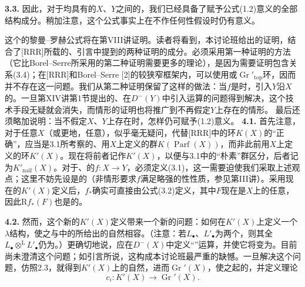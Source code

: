 \textbf{3.3.} 因此，对于均具有的$X$、$Y$之间的，我们已经具备了赋予公式(1.2)意义的全部结构成分。稍加注意，这个公式事实上在不作任何性假设时仍有意义。

这个的黎曼--罗赫公式将在第VIII讲证明。读者将看到，本讨论班给出的证明，结合了[RRR]所载的、引言中提到的两种证明的成分。必须采用第一种证明的方法（它比Borel--Serre所采用的第二种证明需要更多的理论），是因为需要证明包含关系(3.4)；在[RRR]和Borel--Serre [2]的较狭窄框架内，可以使用或$\operatorname{Gr}'_{\mathrm{top}}$环，因而并不存在这一问题。我们从第二种证明保留了这样的做法：当$f$是时，引入$Y$沿$X$的。一旦第XIV讲第1节提出的、在$D^-(Y)$中引入运算的问题得到解决，这个技术手段无疑就会消失，而情形的证明也将推广到不再假定$Y$上存在的情形。
最后还须略加说明：当不假定$X$、$Y$上存在时，怎样仍可赋予(1.2)意义。
\textbf{4.1.} 首先注意，对于任意$X$（或更地，任意），似乎毫无疑问，代替[RRR]中的环$K(X)$的“正确”，应当是3.1所考察的、用$X$上定义的群$K(\operatorname{Parf}(X))$，而非此前用$X$上定义的环$K'(X)$。现在将前者记作$K'(X)$，以便与3.1中的“朴素”群区分，后者记为$K'_{\text{naïf}}(X)$。对于、的$f:X\longrightarrow Y$，必须定义(3.1)，这一需要迫使我们采取上述观点；这里不妨先设是的（非情形要求$f$满足略强的性性质，参见第III讲）。采用现在的$K'(X)$定义后，$f_*$确实可直接由公式(3.2)定义，其中$F$现在是$X$上的任意，因此$\mathrm Rf_*(F)$也是的。

\textbf{4.2.} 然而，这个新的$K'(X)$定义带来一个新的问题：如何在$K'(X)$上定义一个$\lambda$结构，使之与中的所给出的自然相容。（注意：若$L_{\bullet}$、$L'_{\bullet}$为两个，则其全$L_{\bullet}\otimes^{\mathrm L}L'_{\bullet}$仍为。）更确切地说，应在$D^-(X)$中定义“”运算，并使它将变为。目前尚未澄清这个问题；如引言所说，这构成本讨论班最严重的缺憾。一旦解决这个问题，仿照2.3，就得到$K'(X)$上的自然，进而$\operatorname{Gr}'(X)$，使之起的，并定义理论
\[c_i:K'(X)\longrightarrow\operatorname{Gr}'(X).\]

